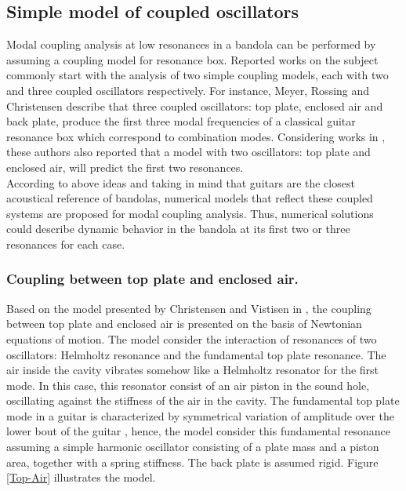 \subsection{Simple model of coupled oscillators}

Modal coupling analysis at low resonances in a bandola can be performed by assuming a coupling model for resonance box. Reported works on the subject \cite{Rossing1, Meyer, Meyer2, Rossing, Rossing3, Christensen, Christensen3, Caldersmith1, Dickens1, Firth1} commonly start with the analysis of two  simple coupling models, each with two and three coupled oscillators respectively. For instance, Meyer, Rossing and Christensen \cite{Rossing1, Meyer, Christensen3} describe that three coupled oscillators: top plate, enclosed air and back plate, produce the first three modal frequencies of a classical guitar resonance box which correspond to combination modes. Considering works in \cite{Meyer2, Rossing3, Christensen}, these authors also reported that a model with two oscillators: top plate and enclosed air, will predict the first two resonances.\\

According to above ideas and taking in mind that guitars are the closest acoustical reference of bandolas, numerical models that reflect these coupled systems are proposed for modal coupling analysis. Thus, numerical solutions could describe dynamic behavior in the bandola at its first two or three resonances for each case.

\subsubsection{Coupling between top plate and enclosed air.}

Based on the model presented by Christensen and Vistisen in \cite{Christensen}, the coupling between top plate and enclosed air is presented on the basis of Newtonian equations of motion. The model consider the interaction of resonances of two oscillators: Helmholtz resonance and the fundamental top plate resonance. The air inside the cavity vibrates somehow like a Helmholtz resonator for the first mode. In this case, this resonator consist of an air piston in the sound hole, oscillating against the stiffness of the air in the cavity. The fundamental top plate mode in a guitar is characterized by symmetrical variation of amplitude over the lower bout of the guitar \cite{Jansson:GuitarModes}, hence, the model consider this fundamental resonance assuming a simple harmonic oscillator consisting of a plate mass and a piston area, together with a spring stiffness. The back plate is assumed rigid. Figure \ref{Top-Air} illustrates the model.


